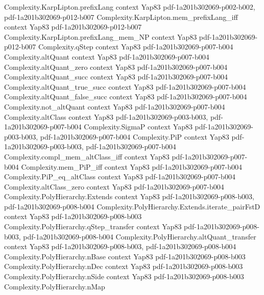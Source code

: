\begin{theorem}
\proofstep
  {Complexity.KarpLipton.prefixLang}
  {context}
  {Yap83}
  {pdf-1a201b302069-p002-b002,
    pdf-1a201b302069-p012-b007}
\proofstep
  {Complexity.KarpLipton.mem_prefixLang_iff}
  {context}
  {Yap83}
  {pdf-1a201b302069-p012-b007}
\proofstep
  {Complexity.KarpLipton.prefixLang_mem_NP}
  {context}
  {Yap83}
  {pdf-1a201b302069-p012-b007}
\proofstep
  {Complexity.qStep}
  {context}
  {Yap83}
  {pdf-1a201b302069-p007-b004}
\proofstep
  {Complexity.altQuant}
  {context}
  {Yap83}
  {pdf-1a201b302069-p007-b004}
\proofstep
  {Complexity.altQuant_zero}
  {context}
  {Yap83}
  {pdf-1a201b302069-p007-b004}
\proofstep
  {Complexity.altQuant_succ}
  {context}
  {Yap83}
  {pdf-1a201b302069-p007-b004}
\proofstep
  {Complexity.altQuant_true_succ}
  {context}
  {Yap83}
  {pdf-1a201b302069-p007-b004}
\proofstep
  {Complexity.altQuant_false_succ}
  {context}
  {Yap83}
  {pdf-1a201b302069-p007-b004}
\proofstep
  {Complexity.not_altQuant}
  {context}
  {Yap83}
  {pdf-1a201b302069-p007-b004}
\proofstep
  {Complexity.altClass}
  {context}
  {Yap83}
  {pdf-1a201b302069-p003-b003,
    pdf-1a201b302069-p007-b004}
\proofstep
  {Complexity.SigmaP}
  {context}
  {Yap83}
  {pdf-1a201b302069-p003-b003,
    pdf-1a201b302069-p007-b004}
\proofstep
  {Complexity.PiP}
  {context}
  {Yap83}
  {pdf-1a201b302069-p003-b003,
    pdf-1a201b302069-p007-b004}
\proofstep
  {Complexity.compl_mem_altClass_iff}
  {context}
  {Yap83}
  {pdf-1a201b302069-p007-b004}
\proofstep
  {Complexity.mem_PiP_iff}
  {context}
  {Yap83}
  {pdf-1a201b302069-p007-b004}
\proofstep
  {Complexity.PiP_eq_altClass}
  {context}
  {Yap83}
  {pdf-1a201b302069-p007-b004}
\proofstep
  {Complexity.altClass_zero}
  {context}
  {Yap83}
  {pdf-1a201b302069-p007-b004}
\proofstep
  {Complexity.PolyHierarchy.Extends}
  {context}
  {Yap83}
  {pdf-1a201b302069-p008-b003,
    pdf-1a201b302069-p008-b004}
\proofstep
  {Complexity.PolyHierarchy.Extends.iterate_pairFstD}
  {context}
  {Yap83}
  {pdf-1a201b302069-p008-b003}
\proofstep
  {Complexity.PolyHierarchy.qStep_transfer}
  {context}
  {Yap83}
  {pdf-1a201b302069-p008-b003,
    pdf-1a201b302069-p008-b004}
\proofstep
  {Complexity.PolyHierarchy.altQuant_transfer}
  {context}
  {Yap83}
  {pdf-1a201b302069-p008-b003,
    pdf-1a201b302069-p008-b004}
\proofstep
  {Complexity.PolyHierarchy.nBase}
  {context}
  {Yap83}
  {pdf-1a201b302069-p008-b003}
\proofstep
  {Complexity.PolyHierarchy.nDec}
  {context}
  {Yap83}
  {pdf-1a201b302069-p008-b003}
\proofstep
  {Complexity.PolyHierarchy.nSide}
  {context}
  {Yap83}
  {pdf-1a201b302069-p008-b003}
\proofstep
  {Complexity.PolyHierarchy.nMap}

\end{theorem}
